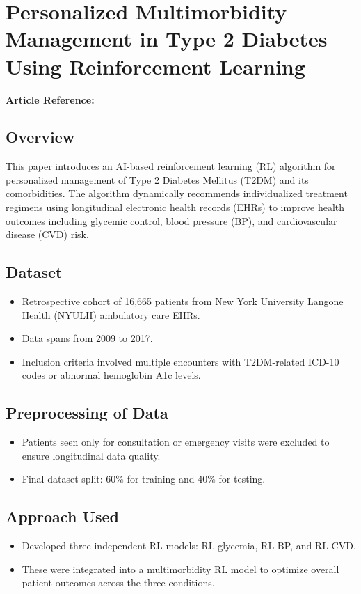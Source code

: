 \section{Personalized Multimorbidity Management in Type 2 Diabetes Using Reinforcement Learning}
\textbf{Article Reference:} \cite{zhengPersonalizedMultimorbidityManagement2021}

\subsection*{Overview}
This paper introduces an AI-based reinforcement learning (RL) algorithm for personalized management of Type 2 Diabetes Mellitus (T2DM) and its comorbidities. The algorithm dynamically recommends individualized treatment regimens using longitudinal electronic health records (EHRs) to improve health outcomes including glycemic control, blood pressure (BP), and cardiovascular disease (CVD) risk.

\subsection*{Dataset}
\begin{itemize}
    \item Retrospective cohort of 16,665 patients from New York University Langone Health (NYULH) ambulatory care EHRs.
    \item Data spans from 2009 to 2017.
    \item Inclusion criteria involved multiple encounters with T2DM-related ICD-10 codes or abnormal hemoglobin A1c levels.
\end{itemize}

\subsection*{Preprocessing of Data}
\begin{itemize}
    \item Patients seen only for consultation or emergency visits were excluded to ensure longitudinal data quality.
    \item Final dataset split: 60\% for training and 40\% for testing.
\end{itemize}

\subsection*{Approach Used}
\begin{itemize}
    \item Developed three independent RL models: RL-glycemia, RL-BP, and RL-CVD.
    \item These were integrated into a multimorbidity RL model to optimize overall patient outcomes across the three conditions.
\end{itemize}

